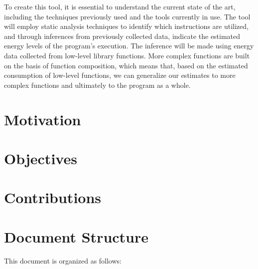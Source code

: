To create this tool, it is essential to understand the current state of the art, including the techniques previously used and the tools currently in use. The tool will employ static analysis techniques to identify which instructions are utilized, and through inferences from previously collected data, indicate the estimated energy levels of the program's execution. The inference will be made using energy data collected from low-level library functions. More complex functions are built on the basis of function composition, which means that, based on the estimated consumption of low-level functions, we can generalize our estimates to more complex functions and ultimately to the program as a whole. 

\section{Motivation}



\section{Objectives}

\blindtext[1]

\blindtext[2]

\section{Contributions}

\Blindtext[2]

\section{Document Structure}

This document is organized as follows:

